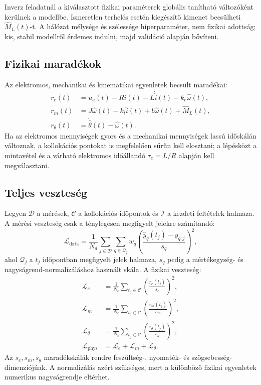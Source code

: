 \documentclass[11pt,a4paper]{article}
\begin{document}
Inverz feladatnál a kiválasztott fizikai paraméterek globális tanítható változóként kerülnek a modellbe. Ismeretlen terhelés esetén kiegészítő kimenet becsülheti $\hat{M}_L(t)$-t. A hálózat mélysége és szélessége hiperparaméter, nem fizikai adottság; kis, stabil modellről érdemes indulni, majd validáció alapján bővíteni.

\subsection{Fizikai maradékok}

Az elektromos, mechanikai és kinematikai egyenletek becsült maradékai:
\begin{align}
  r_e(t) &=
  u_a(t)-R\hat{i}(t)-L\dot{\hat{i}}(t)-k_e\hat{\omega}(t),
  \label{eq:re}\\
  r_m(t) &=
  J\dot{\hat{\omega}}(t)-k_t\hat{i}(t)
      +b\hat{\omega}(t)+\hat{M}_L(t),
  \label{eq:rm}\\
  r_{\theta}(t) &= \dot{\hat{\theta}}(t)-\hat{\omega}(t).
  \label{eq:rtheta}
\end{align}
Ha az elektromos mennyiségek gyors és a mechanikai mennyiségek lassú időskálán változnak, a kollokációs pontokat is megfelelően sűrűn kell elosztani; a lépésközt a mintavétel és a várható elektromos időállandó $\tau_e=L/R$ alapján kell megválasztani.

\subsection{Teljes veszteség}

Legyen $\mathcal{D}$ a mérések, $\mathcal{C}$ a kollokációs időpontok és $\mathcal{I}$ a kezdeti feltételek halmaza. A mérési veszteség csak a ténylegesen megfigyelt jelekre számítandó:
\begin{equation}
  \mathcal{L}_{\mathrm{data}} =
  \frac{1}{N_d}\sum_{j\in\mathcal{D}}\sum_{q\in\mathcal{Q}_j}
  w_q\left(
    \frac{\hat{y}_{q}(t_j)-y_{q,j}}{s_q}
  \right)^2,
  \label{eq:ldata}
\end{equation}
ahol $\mathcal{Q}_j$ a $t_j$ időpontban megfigyelt jelek halmaza, $s_q$ pedig a mértékegység- és nagyságrend-normalizáláshoz használt skála. A fizikai veszteség:
\begin{equation}
\begin{aligned}
  \mathcal{L}_{e} &=
  \frac{1}{N_c}\sum_{t_j\in\mathcal{C}}
    \left(\frac{r_e(t_j)}{s_e}\right)^2,\\
  \mathcal{L}_{m} &=
  \frac{1}{N_c}\sum_{t_j\in\mathcal{C}}
    \left(\frac{r_m(t_j)}{s_m}\right)^2,\\
  \mathcal{L}_{\theta} &=
  \frac{1}{N_c}\sum_{t_j\in\mathcal{C}}
    \left(\frac{r_{\theta}(t_j)}{s_{\dot{\theta}}}\right)^2,\\
  \mathcal{L}_{\mathrm{phys}} &= \mathcal{L}_e+\mathcal{L}_m+\mathcal{L}_{\theta}.
\end{aligned}
\label{eq:lphys}
\end{equation}
Az $s_e,s_m,s_{\dot{\theta}}$ maradékskálák rendre feszültség-, nyomaték- és szögsebesség-dimenziójúak. A normalizálás azért szükséges, mert a különböző fizikai egyenletek numerikus nagyságrendje eltérhet.
\end{document}
